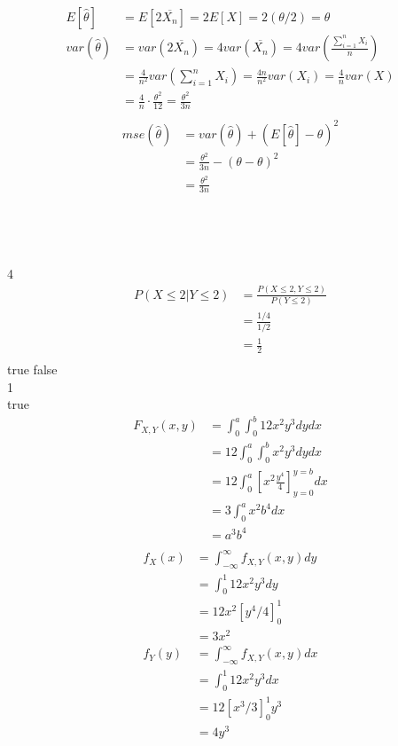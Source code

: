\documentclass[12pt,border=4pt,multi]{article} %
\begin{document}
\begin{align*}
E[\hat{\theta}] &= E[2\overline{X_n}] = 2E[X] = 2(\theta / 2) = \theta\\
var(\hat{\theta}) &= var(2\overline{X_n}) = 4var(\overline{X_n}) = 4var\left(\frac{\sum_{i = 1}^n X_i}{n}\right)\\
&= \frac{4}{n^2}var(\sum_{i = 1}^n X_i) = \frac{4n}{n^2}var(X_i) = \frac{4}{n}var(X)\\
&= \frac{4}{n}\cdot\frac{\theta^2}{12} = \frac{\theta^2}{3n}\\
\end{align*}
\begin{align*}
mse(\hat{\theta}) &= var(\hat{\theta}) + (E[\hat{\theta}] - \theta)^2\\
&= \frac{\theta^2}{3n} - (\theta - \theta)^2\\
&= \frac{\theta^2}{3n}
\end{align*}
\\
\\
\\
\\
4
\begin{align*}
P(X \leq 2 | Y \leq 2) &= \frac{P(X \leq 2, Y \leq 2)}{P(Y \leq 2)}\\
&= \frac{1 / 4}{1 / 2}\\
&= \frac{1}{2}\\
\end{align*}
\newpage
\noindent
true false\\
1\\
true\\
\begin{align*}
F_{X, Y}(x, y) &= \int_0^a \int_0^b 12x^2 y^3 dy dx\\
&= 12\int_0^a \int_0^b x^2 y^3 dy dx\\
&= 12\int_0^a\left[x^2 \frac{y^4}{4}\right]_{y = 0}^{y = b} dx\\
&= 3\int_0^a x^2 b^4 dx\\
&= a^3 b^4\\
\end{align*}
\begin{align*}
f_X(x) &= \int_{-\infty}^{\infty} f_{X, Y}(x, y) dy\\
&= \int_0^1 12x^2 y^3 dy\\
&= 12x^2[y^4 / 4]_0^1\\
&= 3x^2\\
f_Y(y) &= \int_{-\infty}^{\infty} f_{X, Y}(x, y) dx\\
&= \int_0^1 12x^2 y^3 dx\\
&= 12[x^3 / 3]_0^1 y^3\\
&= 4y^3\\
\end{align*}
\end{document}
